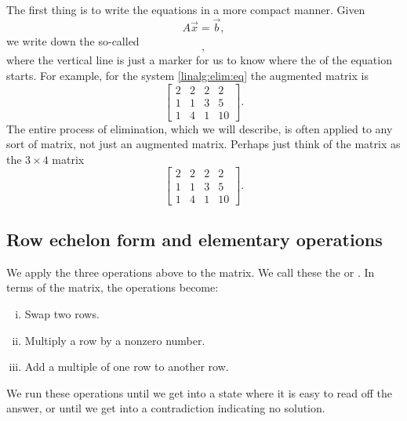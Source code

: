 The first thing is to write the equations in a more compact manner.  Given
\begin{equation*}
A \vec{x} = \vec{b} ,
\end{equation*}
we write down the so-called \emph{}
\begin{equation*}
[ A ~|~ \vec{b} ] ,
\end{equation*}
where the vertical line is just a marker for us to know where the
 of the equation starts.  For example,
for the system \eqref{linalg:elim:eq} the augmented matrix is
\begin{equation*}
\left[
\begin{array}{ccc|c}
2 & 2 & 2 & 2 \\
1 & 1 & 3 & 5 \\
1 & 4 & 1 & 10
\end{array}
\right] .
\end{equation*}
The entire process of elimination, which we will describe,
is often applied to any sort of matrix,
not just an
augmented matrix.  Perhaps just think of the matrix as the $3 \times 4$
matrix
\begin{equation*}
\begin{bmatrix}
2 & 2 & 2 & 2 \\
1 & 1 & 3 & 5 \\
1 & 4 & 1 & 10
\end{bmatrix} .
\end{equation*}

\subsection{Row echelon form and elementary operations}

We apply the three operations above to the matrix.  We call these
the \emph{} or
\emph{}.
In terms of the matrix,
the operations become:
\begin{enumerate}[(i)]
\item Swap two rows.
\item Multiply a row by a nonzero number.
\item Add a multiple of one row to another row.
\end{enumerate}
\pagebreak[2]
We run these operations until we 
get into a state where it is easy to read off the answer,
or until we get into a contradiction indicating no solution.

